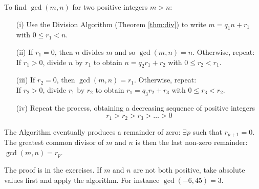  To find $\gcd(m,n)$ for two positive integers $m>n$:

\begin{itemize}
\item[(i)] Use the Division Algorithm (Theorem \ref{thm:div}) to write $m=q_1n+r_1$ with $0\le r_1<n$.
\item[(ii)] If $r_1=0$, then $n$ divides $m$ and so $\gcd(m,n)=n$. Otherwise, repeat:\\
	If $r_1>0$, divide $n$ by $r_1$ to obtain $n=q_2r_1+r_2$ with $0\le r_2<r_1$.
\item[(iii)] If $r_2=0$, then $\gcd(m,n)=r_1$. Otherwise, repeat:\\
	If $r_2>0$, divide $r_1$ by $r_2$ to obtain $r_1=q_3r_2+r_3$ with $0\le r_3<r_2$.
\item[(iv)] Repeat the process, obtaining a decreasing sequence of positive integers
\[r_1>r_2>r_3>\ldots>0\]
\end{itemize}


\begin{thm}\label{thm:euclidalg}
The Algorithm eventually produces a remainder of zero: $\exists p$ such that $r_{p+1}=0$. The greatest common divisor of $m$ and $n$ is then the last non-zero remainder: $\gcd(m,n)=r_p$.
\end{thm}

\noindent The proof is in the exercises. If $m$ and $n$ are not both positive, take absolute values first and apply the algorithm. For instance $\gcd(-6,45)=3$.


